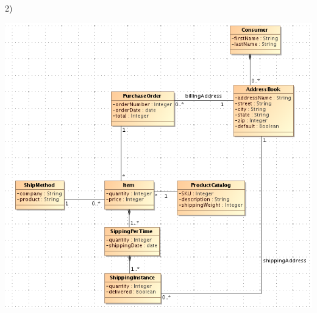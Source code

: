 \documentclass[12pt]{article}
\begin{document}
\pagebreak

2)

\includegraphics[width=140mm]{b.png}
\end{document}
